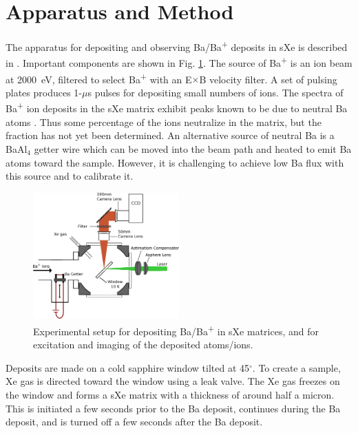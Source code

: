 \documentclass[aps,pra,reprint,superscriptaddress]{revtex4-1}
\begin{document}

\section{Apparatus and Method}
\label{sec:apparatus}

The apparatus for depositing and observing Ba/Ba\textsuperscript{+} deposits in sXe is described in \cite{Mong2015}.  Important components are shown in Fig. \ref{fig:apparatus}.  The source of Ba\textsuperscript{+} is an ion beam at 2000~eV, filtered to select Ba\textsuperscript{+} with an E$\times$B velocity filter.  A set of pulsing plates produces 1-$\mu$s pulses for depositing small numbers of ions.  The spectra of Ba\textsuperscript{+} ion deposits in the sXe matrix exhibit peaks known to be due to neutral Ba atoms \cite{Mong2015}.  Thus some percentage of the ions neutralize in the matrix, but the fraction has not yet been determined.  An alternative source of neutral Ba is a BaAl$_{4}$ getter wire which can be moved into the beam path and heated to emit Ba atoms toward the sample.  However, it is challenging to achieve low Ba flux with this source and to calibrate it.

\begin{figure}
\includegraphics[width=0.5\textwidth]{figures/cryo_inkscape_chris_full.eps}
\caption{Experimental setup for depositing Ba/Ba\textsuperscript{+} in sXe matrices, and for excitation and imaging of the deposited atoms/ions.}
\label{fig:apparatus}
\end{figure}

Deposits are made on a cold sapphire window tilted at 45$^{\circ}$.  To create a sample, Xe gas is directed toward the window using a leak valve. The Xe gas freezes on the window and forms a sXe matrix with a thickness of around half a micron.  This is initiated a few seconds prior to the Ba deposit, continues during the Ba deposit, and is turned off a few seconds after the Ba deposit.
\end{document}
